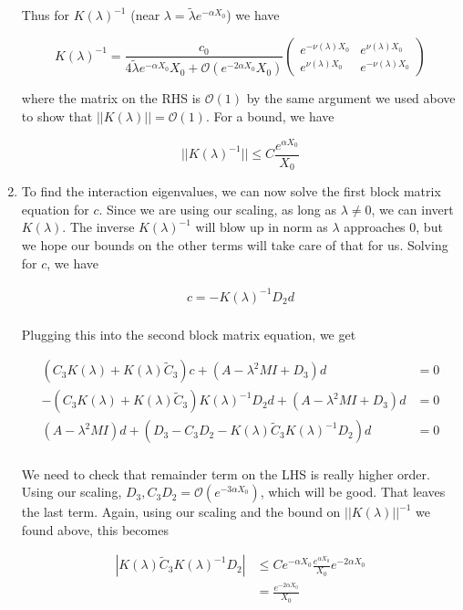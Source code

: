 \documentclass[12pt]{article}
\begin{document}
\begin{enumerate}
Thus for $K(\lambda)^{-1}$ (near $\lambda = \tilde{\lambda} e^{-\alpha X_0}$) we have

\begin{equation}
K(\lambda)^{-1} = 
\frac{c_0}{4 \tilde{\lambda}e^{-\alpha X_0}X_0 + \mathcal{O}(e^{-2 \alpha X_0}X_0)}
\begin{pmatrix}
e^{-\nu(\lambda)X_0} & e^{\nu(\lambda)X_0} \\
e^{\nu(\lambda)X_0} & e^{-\nu(\lambda)X_0}
\end{pmatrix}
\end{equation}

where the matrix on the RHS is $\mathcal{O}(1)$ by the same argument we used above to show that $||K(\lambda)|| = \mathcal{O}(1)$. For a bound, we have

\[
||K(\lambda)^{-1}|| \leq C \frac{ e^{\alpha X_0} }{X_0}
\]

\item To find the interaction eigenvalues, we can now solve the first block matrix equation for $c$. Since we are using our scaling, as long as $\lambda \neq 0$, we can invert $K(\lambda)$. The inverse $K(\lambda)^{-1}$ will blow up in norm as $\lambda$ approaches 0, but we hope our bounds on the other terms will take care of that for us. Solving for $c$, we have

\begin{align*}
c = -K(\lambda)^{-1} D_2 d \\
\end{align*}

Plugging this into the second block matrix equation, we get

\begin{align*}
(C_3 K(\lambda) + K(\lambda) \tilde{C}_3) c + (A - \lambda^2 MI + D_3)d &= 0 \\
-(C_3 K(\lambda) + K(\lambda) \tilde{C}_3)K(\lambda)^{-1} D_2 d + (A - \lambda^2 MI + D_3)d &= 0 \\
(A - \lambda^2 MI )d + (D_3 - C_3 D_2 - K(\lambda) \tilde{C}_3 K(\lambda)^{-1} D_2) d &= 0 \\
\end{align*}

We need to check that remainder term on the LHS is really higher order. Using our scaling, $D_3, C_3 D_2 = \mathcal{O}(e^{-3 \alpha X_0})$, which will be good. That leaves the last term. Again, using our scaling and the bound on $||K(\lambda)||^{-1}$ we found above, this becomes

\begin{align*}
|K(\lambda) \tilde{C}_3 K(\lambda)^{-1} D_2| &\leq
C e^{-\alpha X_0} \frac{e^{\alpha X_0}}{X_0} e^{-2 \alpha X_0} \\
&= \frac{e^{-2 \alpha X_0}}{X_0}
\end{align*}


\end{enumerate}
\end{document}
